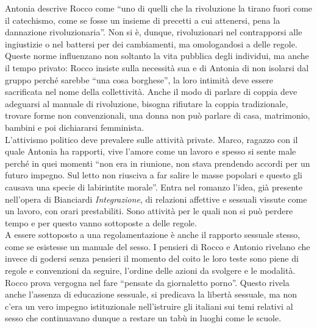 Antonia descrive Rocco come \enquote{uno di quelli che la rivoluzione la tirano fuori come il catechismo, come se fosse un insieme di precetti a cui attenersi, pena la dannazione rivoluzionaria}.
Non si è, dunque, rivoluzionari nel contrapporsi alle ingiustizie o nel battersi per dei cambiamenti, ma omologandosi a delle regole.
Queste norme influenzano non soltanto la vita pubblica degli individui, ma anche il tempo privato: Rocco insiste sulla necessità sua e di Antonia di non isolarsi dal gruppo perché sarebbe \enquote{una cosa borghese}, la loro intimità deve essere sacrificata nel nome della collettività.
Anche il modo di parlare di coppia deve adeguarsi al manuale di rivoluzione, bisogna rifiutare la coppia tradizionale, trovare forme non convenzionali, una donna non può parlare di casa, matrimonio, bambini e poi dichiararsi femminista.
\\L'attivismo politico deve prevalere sulle attività private.
Marco, ragazzo con il quale Antonia ha rapporti, vive l'amore come un lavoro e spesso si sente male perché in quei momenti \enquote{non era in riunione, non stava  prendendo accordi per un futuro impegno. Sul letto non riusciva a far salire le masse popolari e questo gli causava una specie di labirintite morale}.
Entra nel romanzo l'idea, già presente nell'opera di Bianciardi \textit{Integrazione}, di relazioni affettive e sessuali vissute come un lavoro, con orari prestabiliti.
Sono attività per le quali non si può perdere tempo e per questo vanno sottoposte a delle regole.
\\A essere sottoposto a una regolamentazione è anche il rapporto sessuale stesso, come se esistesse un manuale del sesso.
I pensieri di Rocco e Antonio rivelano che invece di godersi senza pensieri il momento del coito le loro teste sono piene di regole e convenzioni da seguire, l'ordine delle azioni da svolgere e le modalità.
Rocco prova vergogna nel fare \enquote{pensate da giornaletto porno}.
Questo rivela anche l'assenza di educazione sessuale, si predicava la libertà sessuale, ma non c'era un vero impegno istituzionale nell'istruire gli italiani sui temi relativi al sesso che continuavano dunque a restare un tabù in luoghi come le scuole. 


